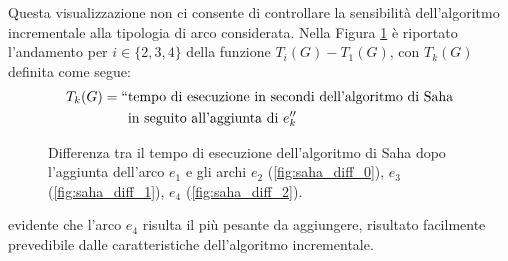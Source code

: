 Questa visualizzazione non ci consente di controllare la sensibilità dell'algoritmo incrementale alla tipologia di arco considerata. Nella Figura \ref{fig:saha_depends_cycle} è riportato l'andamento per $i \in \{2,3,4\}$ della funzione $T_i(G) - T_1(G)$, con $T_k(G)$ definita come segue:
\begin{align*}
    T_k(G) = ``&\text{tempo di esecuzione in secondi dell'algoritmo di Saha}\\
    &\text{in seguito all'aggiunta di } e_k''
\end{align*}

\begin{figure}[H]
    \caption{Differenza tra il tempo di esecuzione dell'algoritmo di Saha dopo l'aggiunta dell'arco $e_1$ e gli archi $e_2$ (\ref*{fig:saha_diff_0}), $e_3$ (\ref*{fig:saha_diff_1}), $e_4$ (\ref*{fig:saha_diff_2}).}
    \label{fig:saha_depends_cycle}
\end{figure}

\accente evidente che l'arco $e_4$ risulta il più pesante da aggiungere, risultato facilmente prevedibile dalle caratteristiche dell'algoritmo incrementale.

